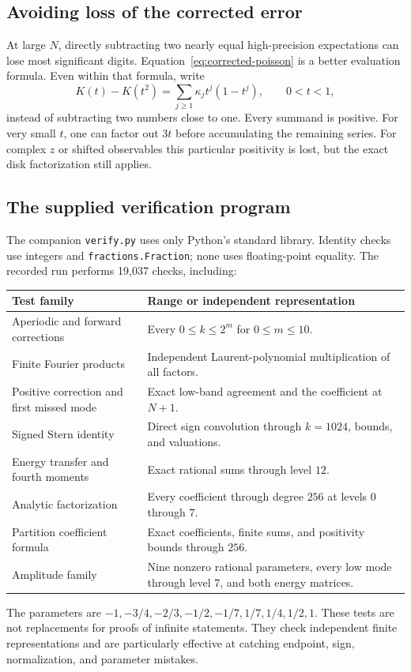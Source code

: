 \documentclass[11pt,a4paper]{article}
\numberwithin{equation}{section}
\theoremstyle{definition}
\theoremstyle{remark}
\begin{document}
\subsection{Avoiding loss of the corrected error}
At large $N$, directly subtracting two nearly equal high-precision expectations
can lose most significant digits. Equation~\eqref{eq:corrected-poisson} is a
better evaluation formula. Even within that formula, write
\begin{equation}
 K(t)-K(t^2)=\sum_{j\ge1}\kappa_jt^j(1-t^j),\qquad 0<t<1,
 \label{eq:positive-evaluation}
\end{equation}
instead of subtracting two numbers close to one. Every summand is positive.
For very small $t$, one can factor out $3t$ before accumulating the remaining
series. For complex $z$ or shifted observables this particular positivity is
lost, but the exact disk factorization still applies.

\subsection{The supplied verification program}
The companion \texttt{verify.py} uses only Python's standard library. Identity
checks use integers and \texttt{fractions.Fraction}; none uses floating-point
equality. The recorded run performs 19,037 checks, including:
\begin{center}
\begin{tabularx}{\textwidth}{@{}p{}X@{}}
\toprule
Test family & Range or independent representation \\
\midrule
Aperiodic and forward corrections & Every $0\le k\le2^m$ for $0\le m\le10$. \\
Finite Fourier products & Independent Laurent-polynomial multiplication of all factors. \\
Positive correction and first missed mode & Exact low-band agreement and the coefficient at $N+1$. \\
Signed Stern identity & Direct sign convolution through $k=1024$, bounds, and valuations. \\
Energy transfer and fourth moments & Exact rational sums through level $12$. \\
Analytic factorization & Every coefficient through degree $256$ at levels $0$ through $7$. \\
Partition coefficient formula & Exact coefficients, finite sums, and positivity bounds through $256$. \\
Amplitude family & Nine nonzero rational parameters, every low mode through level $7$, and both energy matrices. \\
\bottomrule
\end{tabularx}
\end{center}
The parameters are $-1,-3/4,-2/3,-1/2,-1/7,1/7,1/4,1/2,1$.
These tests are not replacements for proofs of infinite statements. They check
independent finite representations and are particularly effective at catching
endpoint, sign, normalization, and parameter mistakes.
\end{document}
